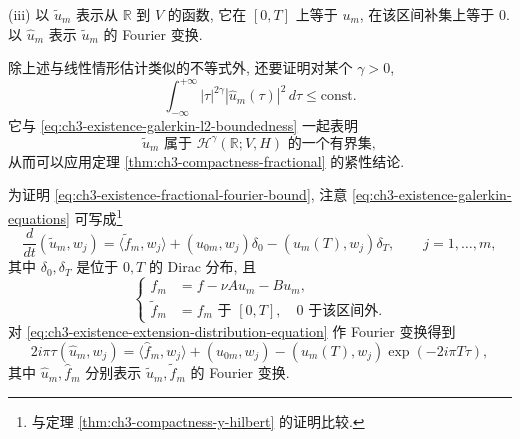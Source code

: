 (iii) 以 $\widetilde u_m$ 表示从 $\mathbb R$ 到 $V$ 的函数, 它在 $[0,T]$ 上等于 $u_m$, 在该区间补集上等于 $0$. 以 $\widehat u_m$ 表示 $\widetilde u_m$ 的 Fourier 变换.

除上述与线性情形估计类似的不等式外, 还要证明对某个 $\gamma>0$,
\begin{equation}
\int_{-\infty}^{+\infty}|\tau|^{2\gamma}|\widehat u_m(\tau)|^2\,d\tau
\leq\mathrm{const}.
\label{eq:ch3-existence-fractional-fourier-bound}
\end{equation}
它与 \eqref{eq:ch3-existence-galerkin-l2-boundedness} 一起表明
\begin{equation}
\widetilde u_m\text{ 属于 }\mathcal H^\gamma(\mathbb R;V,H)\text{ 的一个有界集},
\label{eq:ch3-existence-fractional-space-boundedness}
\end{equation}
从而可以应用定理 \ref{thm:ch3-compactness-fractional} 的紧性结论.

\hypertarget{chapter-03-page-209}{}
为证明 \eqref{eq:ch3-existence-fractional-fourier-bound}, 注意 \eqref{eq:ch3-existence-galerkin-equations} 可写成\footnote{与定理 \ref{thm:ch3-compactness-y-hilbert} 的证明比较.}
\begin{equation}
\frac d{dt}(\widetilde u_m,w_j)
=\langle\widetilde f_m,w_j\rangle
+(u_{0m},w_j)\delta_0-(u_m(T),w_j)\delta_T,
\qquad j=1,\ldots,m,
\label{eq:ch3-existence-extension-distribution-equation}
\end{equation}
其中 $\delta_0,\delta_T$ 是位于 $0,T$ 的 Dirac 分布, 且
\begin{equation}
\left\{
\begin{aligned}
f_m&=f-\nu Au_m-Bu_m,\\
\widetilde f_m&=f_m\text{ 于 }[0,T],\quad0\text{ 于该区间外}.
\end{aligned}
\right.
\label{eq:ch3-existence-extension-force}
\end{equation}
对 \eqref{eq:ch3-existence-extension-distribution-equation} 作 Fourier 变换得到
\begin{equation}
2i\pi\tau(\widehat u_m,w_j)
=\langle\widehat f_m,w_j\rangle+(u_{0m},w_j)
-(u_m(T),w_j)\exp(-2i\pi T\tau),
\label{eq:ch3-existence-fourier-galerkin-equation}
\end{equation}
其中 $\widehat u_m,\widehat f_m$ 分别表示 $\widetilde u_m,\widetilde f_m$ 的 Fourier 变换.

